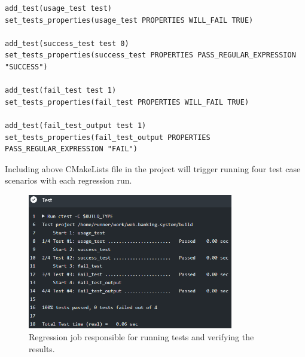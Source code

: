 \documentclass[a4paper,12pt]{book}
\begin{document}
{\begin{lstlisting}
add_test(usage_test test)
set_tests_properties(usage_test PROPERTIES WILL_FAIL TRUE)

add_test(success_test test 0)
set_tests_properties(success_test PROPERTIES PASS_REGULAR_EXPRESSION "SUCCESS")

add_test(fail_test test 1)
set_tests_properties(fail_test PROPERTIES WILL_FAIL TRUE)

add_test(fail_test_output test 1)
set_tests_properties(fail_test_output PROPERTIES PASS_REGULAR_EXPRESSION "FAIL")
\end{lstlisting}

\bigskip Including above CMakeLists file in the project will trigger running four test case scenarios with each regression run.

\begin{figure}[H]
  \centering
    \includegraphics[width=0.8\textwidth]{testreg}
    \caption{Regression job responsible for running tests and verifying the results.}
\end{figure}
}
\end{document}
